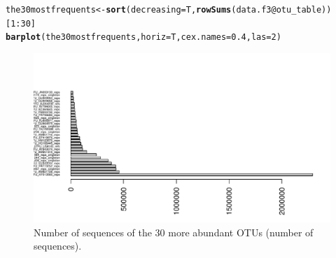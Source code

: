 \documentclass[12pt]{article}\usepackage[]{graphicx}\usepackage[]{color}
\makeatletter
\def\maxwidth{ %
  \ifdim\Gin@nat@width>\linewidth
    \linewidth
  \else
    \Gin@nat@width
  \fi
}
\newcommand{\hlnum}[1]{\textcolor[rgb]{0.686,0.059,0.569}{#1}}%
\newcommand{\hlopt}[1]{\textcolor[rgb]{0,0,0}{#1}}%
\newcommand{\hlstd}[1]{\textcolor[rgb]{0.345,0.345,0.345}{#1}}%
\newcommand{\hlkwb}[1]{\textcolor[rgb]{0.69,0.353,0.396}{#1}}%
\newcommand{\hlkwc}[1]{\textcolor[rgb]{0.333,0.667,0.333}{#1}}%
\newcommand{\hlkwd}[1]{\textcolor[rgb]{0.737,0.353,0.396}{\textbf{#1}}}%
\newenvironment{kframe}{%
 \def\at@end@of@kframe{}%
 \ifinner\ifhmode%
  \def\at@end@of@kframe{\end{minipage}}%
  \begin{minipage}{\columnwidth}%
 \fi\fi%
 \def\FrameCommand##1{\hskip\@totalleftmargin \hskip-\fboxsep
 \colorbox{shadecolor}{##1}\hskip-\fboxsep
     \hskip-\linewidth \hskip-\@totalleftmargin \hskip\columnwidth}%
 \MakeFramed {\advance\hsize-\width
   \@totalleftmargin\z@ \linewidth\hsize
   \@setminipage}}%
 {\par\unskip\endMakeFramed%
 \at@end@of@kframe}
\newenvironment{knitrout}{}{} %
\numberwithin{figure}{section}
\makeatother
\begin{document}
\begin{knitrout}\small
{}\color{fgcolor}\begin{kframe}
\begin{alltt}
\hlstd{the30mostfrequents} \hlkwb{<-} \hlkwd{sort}\hlstd{(}\hlkwc{decreasing} \hlstd{= T,} \hlkwd{rowSums}\hlstd{(data.f3}\hlopt{@}\hlkwc{otu_table}\hlstd{))[}\hlnum{1}\hlopt{:}\hlnum{30}\hlstd{]}
\hlkwd{barplot}\hlstd{(the30mostfrequents,} \hlkwc{horiz} \hlstd{= T,} \hlkwc{cex.names} \hlstd{=} \hlnum{0.4}\hlstd{,} \hlkwc{las} \hlstd{=} \hlnum{2}\hlstd{)}
\end{alltt}
\end{kframe}\begin{figure}

{\centering \includegraphics[width=\maxwidth]{figure/unnamed-chunk-25-1} 

}

\caption[Number of sequences of the 30 more abundant OTUs (number of sequences)]{Number of sequences of the 30 more abundant OTUs (number of sequences).}\label{fig:unnamed-chunk-25}
\end{figure}


\end{knitrout}
\end{document}
